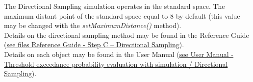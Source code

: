 \renewcommand{\filename}{docUC_ThresholdExceedance_DirectionalSampling.tex}
\renewcommand{\filetitle}{UC : Creation of a Directional Sampling  simulation algorithm}

\HeaderIIILevel





The Directional Sampling simulation operates in the standard space. The maximum distant point of the standard space equal to 8 by default (this value may be changed with the {\itshape setMaximumDistance()} method).\\


Details on the directional sampling method may be found in the Reference Guide (\href{OpenTURNS_ReferenceGuide.pdf}{see files Reference Guide - Step C -- Directional Sampling}).\\

Details on each object may be found in the User Manual  (\href{OpenTURNS_UserManual_TUI.pdf}{see User Manual - Threshold exceedance probability evaluation with simulation / Directional Sampling}).\\


